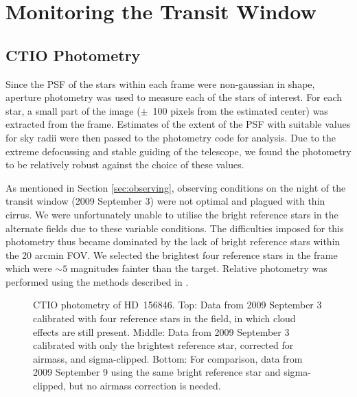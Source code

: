 \documentclass[12pt,preprint]{emulateapj}
\begin{document}
\section{Monitoring the Transit Window}
\subsection{CTIO Photometry}
\label{sec:photometry}

Since the PSF of the stars within each frame were non-gaussian in
shape, aperture photometry was used to measure each of the stars of
interest. For each star, a small part of the image ($\pm$~100 pixels
from the estimated center) was extracted from the frame. Estimates of
the extent of the PSF with suitable values for sky radii were then
passed to the photometry code for analysis. Due to the extreme
defocussing and stable guiding of the telescope, we found the
photometry to be relatively robust against the choice of these values.

As mentioned in Section \ref{sec:observing}, observing conditions on
the night of the transit window (2009 September 3) were not optimal
and plagued with thin cirrus. We were unfortunately unable to utilise
the bright reference stars in the alternate fields due to these
variable conditions. The difficulties imposed for this photometry thus
became dominated by the lack of bright reference stars within the 20
arcmin FOV. We selected the brightest four reference stars in the
frame which were $\sim 5$ magnitudes fainter than the target. Relative
photometry was performed using the methods described in \citet{eve01}.

\begin{figure}
  \caption{CTIO photometry of HD~156846. Top: Data from 2009 September
    3 calibrated with four reference stars in the field, in which
    cloud effects are still present. Middle: Data from 2009 September
    3 calibrated with only the brightest reference star, corrected
    for airmass, and sigma-clipped. Bottom: For comparison, data from
    2009 September 9 using the same bright reference star and
    sigma-clipped, but no airmass correction is needed.}
  \label{fig:phot1}
\end{figure}
\end{document}
